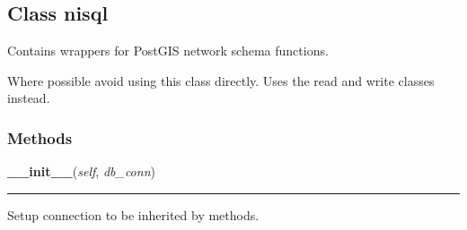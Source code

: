 
\subsection{Class nisql}

    \label{nx_pgnet:nisql}
Contains wrappers for PostGIS network schema functions.

Where possible avoid using this class directly. Uses the read and write 
classes instead.



  \subsubsection{Methods}

    \label{nx_pgnet:nisql:__init__}

    \vspace{0.5ex}

\hspace{.8\funcindent}\begin{boxedminipage}{\funcwidth}

    \raggedright \textbf{\_\_init\_\_}(\textit{self}, \textit{db\_conn})

    \vspace{-1.5ex}

    \rule{\textwidth}{0.5\fboxrule}
\setlength{\parskip}{2ex}
    Setup connection to be inherited by methods.

\setlength{\parskip}{1ex}
    \end{boxedminipage}

    \label{nx_pgnet:nisql:create_network_tables}

    \vspace{0.5ex}


